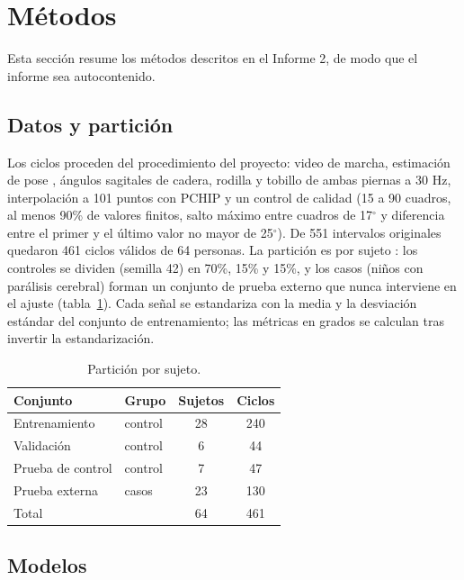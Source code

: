 \documentclass[11pt,a4paper]{article}
\newcommand{\gr}{$^{\circ}$}
\begin{document}
\section{Métodos}
\label{sec:metodos}

Esta sección resume los métodos descritos en el Informe 2, de modo que el informe sea autocontenido.

\subsection{Datos y partición}
\label{sec:datos}

Los ciclos proceden del procedimiento del proyecto: video de marcha, estimación de pose \cite{fang2023alphapose}, ángulos sagitales de cadera, rodilla y tobillo de ambas piernas a 30 Hz, interpolación a 101 puntos con PCHIP \cite{fritsch1980} y un control de calidad (15 a 90 cuadros, al menos 90\% de valores finitos, salto máximo entre cuadros de 17\gr{} y diferencia entre el primer y el último valor no mayor de 25\gr). De 551 intervalos originales quedaron 461 ciclos válidos de 64 personas. La partición es por sujeto \cite{saeb2017}: los controles se dividen (semilla 42) en 70\%, 15\% y 15\%, y los casos (niños con parálisis cerebral) forman un conjunto de prueba externo que nunca interviene en el ajuste (tabla~\ref{tab:particion}). Cada señal se estandariza con la media y la desviación estándar del conjunto de entrenamiento; las métricas en grados se calculan tras invertir la estandarización.

\begin{table}[h]
\centering\small
\begin{tabular}{llcc}
\toprule
Conjunto & Grupo & Sujetos & Ciclos \\
\midrule
Entrenamiento & control & 28 & 240 \\
Validación & control & 6 & 44 \\
Prueba de control & control & 7 & 47 \\
Prueba externa & casos & 23 & 130 \\
\midrule
Total & & 64 & 461 \\
\bottomrule
\end{tabular}
\caption{Partición por sujeto.}
\label{tab:particion}
\end{table}

\subsection{Modelos}
\label{sec:modelos}
\end{document}
